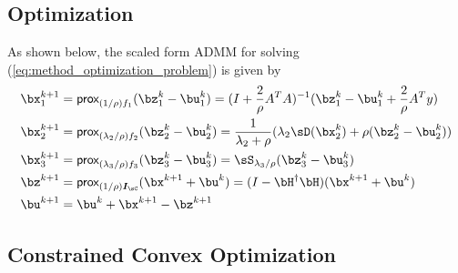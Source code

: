 \documentclass[11pt]{article}
\renewcommand{\sI}{\boldsymbol{I}}
\newcommand{\prox}{\textsf{prox}}
\begin{document}
\subsection{Optimization}

As shown below, the scaled form ADMM for solving (\ref{eq:method_optimization_problem}) is given by 
\begin{align*}
    \bx_1^{k+1}
        &= \prox_{(1/\rho)f_1}(\bz_1^k - \bu_1^k) 
        = (I + \frac{2}{\rho} A^TA)^{-1} ( \bz_1^k - \bu_1^k + \frac{2}{\rho}A^T y) \\
    \bx_2^{k+1}
        &= \prox_{(\lambda_2/\rho)f_2}(\bz_2^k - \bu_2^k) 
        = \frac{1}{\lambda_2+\rho} (\lambda_2 \sD(\bx_2^k) + \rho(\bz_2^k - \bu_2^k)) \\
    \bx_3^{k+1}
        &= \prox_{(\lambda_3/\rho)f_3} (\bz_3^k - \bu_3^k) 
        = \sS_{\lambda_3/\rho}(\bz_3^k - \bu_3^k) \\
    \bz^{k+1}
        &= \prox_{(1/\rho)\sI_{\sC}}(\bx^{k+1} + \bu^k)
        = (I - \bH^{\dagger}\bH)(\bx^{k+1}+\bu^k) \\
    \bu^{k+1}
        &= \bu^{k} + \bx^{k+1} - \bz^{k+1}
\end{align*}

 

\subsection{Constrained Convex Optimization}
\end{document}
